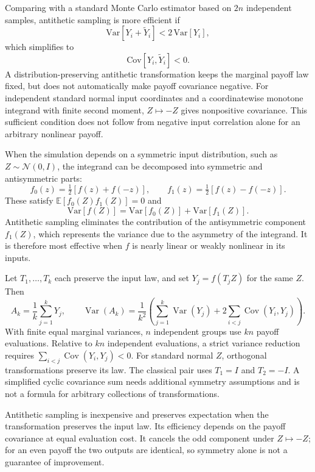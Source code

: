 \begin{remark}
Comparing with a standard Monte Carlo estimator based on \(2n\) independent samples, antithetic sampling is more efficient if
\[
\mathrm{Var}[Y_i + \widetilde{Y}_i] < 2\,\mathrm{Var}[Y_i],
\]
which simplifies to
\[
\mathrm{Cov}[Y_i,\widetilde{Y}_i] < 0.
\]
A distribution-preserving antithetic transformation keeps the
marginal payoff law fixed, but does not automatically make payoff
covariance negative. For independent standard normal input coordinates and a
coordinatewise monotone integrand with finite second moment, $Z\mapsto-Z$ gives nonpositive
covariance. This sufficient condition does not follow from negative
input correlation alone for an arbitrary nonlinear payoff.
\end{remark}

\begin{remark}
When the simulation depends on a symmetric input distribution, such as \(Z \sim \mathcal{N}(0,I)\), the integrand can be decomposed into symmetric and antisymmetric parts:
\[
f_0(z) = \tfrac{1}{2}[f(z) + f(-z)], \qquad
f_1(z) = \tfrac{1}{2}[f(z) - f(-z)].
\]
These satisfy \(\mathbb{E}[f_0(Z)f_1(Z)] = 0\) and
\[
\mathrm{Var}[f(Z)] = \mathrm{Var}[f_0(Z)] + \mathrm{Var}[f_1(Z)].
\]
Antithetic sampling eliminates the contribution of the antisymmetric component \(f_1(Z)\), which represents the variance due to the asymmetry of the integrand. It is therefore most effective when \(f\) is nearly linear or weakly nonlinear in its inputs.
\end{remark}

\begin{remark}
Let $T_1,\ldots,T_k$ each preserve the input law, and set
$Y_j=f(T_jZ)$ for the same $Z$. Then
\[
A_k=\frac1k\sum_{j=1}^kY_j,\qquad
\operatorname{Var}(A_k)=\frac1{k^2}
\left(\sum_{j=1}^k\operatorname{Var}(Y_j)
+2\sum_{i<j}\operatorname{Cov}(Y_i,Y_j)\right).
\]
With finite equal marginal variances, $n$ independent groups use $kn$
payoff evaluations. Relative to $kn$ independent evaluations, a
strict variance reduction requires
$\sum_{i<j}\operatorname{Cov}(Y_i,Y_j)<0$.
For standard normal $Z$, orthogonal transformations preserve its law.
The classical pair uses $T_1=I$ and $T_2=-I$. A simplified cyclic
covariance sum needs additional symmetry assumptions and is not a
formula for arbitrary collections of transformations.
\end{remark}

\begin{remark}
Antithetic sampling is inexpensive and preserves expectation when
the transformation preserves the input law. Its efficiency depends
on the payoff covariance at equal evaluation cost. It cancels the
odd component under $Z\mapsto-Z$; for an even payoff the two outputs
are identical, so symmetry alone is not a guarantee of improvement.
\end{remark}

